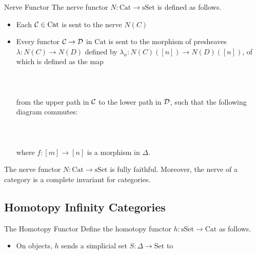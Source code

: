 \documentclass[a4paper]{article}
\begin{document}
\begin{defn}{Nerve Functor}{} The nerve functor $N:\text{Cat}\to\text{sSet}$ is defined as follows. 
\begin{itemize}
\item Each $\mathcal{C}\in\text{Cat}$ is sent to the nerve $N(C)$
\item Every functor $\mathcal{C}\to\mathcal{D}$ in $\text{Cat}$ is sent to the morphism of presheaves $\lambda:N(C)\to N(D)$ defined by $\lambda_n:N(C)([n])\to N(D)([n])$, of which is defined as the map \\~\\
\\~\\
from the upper path in $\mathcal{C}$ to the lower path in $\mathcal{D}$, such that the following diagram commutes: \\~\\
\\~\\
where $f:[m]\to[n]$ is a morphism in $\Delta$. 
\end{itemize}
\end{defn}

\begin{thm}{}{} The nerve functor $N:\text{Cat}\to\text{sSet}$ is fully faithful. Moreover, the nerve of a category is a complete invariant for categories. 
\end{thm}

\subsection{Homotopy Infinity Categories}
\begin{defn}{The Homotopy Functor}{} Define the homotopy functor $h:\text{sSet}\to\text{Cat}$ as follows. 
\begin{itemize}
\item On objects, $h$ sends a simplicial set $S:\Delta\to\text{Set}$ to 
\end{itemize}
\end{defn}
\end{document}
